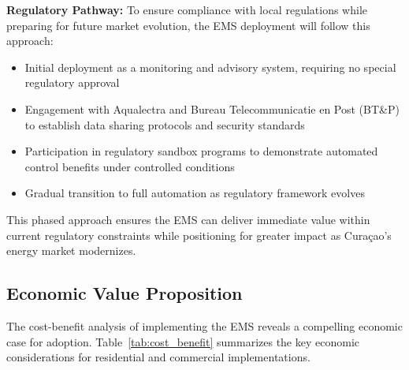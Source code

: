 \documentclass[12pt,a4paper]{article}
\begin{document}
\textbf{Regulatory Pathway:} To ensure compliance with local regulations while preparing for future market evolution, the EMS deployment will follow this approach:
\begin{itemize}
    \item Initial deployment as a monitoring and advisory system, requiring no special regulatory approval
    \item Engagement with Aqualectra and Bureau Telecommunicatie en Post (BT\&P) to establish data sharing protocols and security standards
    \item Participation in regulatory sandbox programs to demonstrate automated control benefits under controlled conditions
    \item Gradual transition to full automation as regulatory framework evolves
\end{itemize}

This phased approach ensures the EMS can deliver immediate value within current regulatory constraints while positioning for greater impact as Curaçao's energy market modernizes.

\subsection{Economic Value Proposition}

The cost-benefit analysis of implementing the EMS reveals a compelling economic case for adoption. Table~\ref{tab:cost_benefit} summarizes the key economic considerations for residential and commercial implementations.
\end{document}
